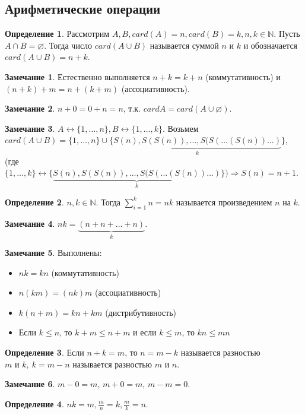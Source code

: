 \documentclass[a4paper, 12pt]{article}
\newcommand{\N}{\mathbb{N}}
\renewcommand{\emptyset}{\varnothing}
\theoremstyle{definition}
\newtheorem*{definition}{Определение}
\newtheorem*{comm}{Замечание}
\begin{document}
    \subsection{Арифметические операции}
        \begin{definition}
            Рассмотрим $A,B, card(A)=n, card(B)=k, n,k\in \N$. Пусть $A\cap B=\emptyset$. Тогда число $card(A\cup B)$ называется суммой $n$ и $k$ и обозначается $card(A\cup B)=n+k$.
        \end{definition}
        \begin{comm}
            Естественно выполняется $n+k=k+n$ (коммутативность) и\\ $(n+k)+m=n+(k+m)$ (ассоциативность).
        \end{comm}
        \begin{comm}
            $n+0=0+n=n$, т.к. $cardA=card(A\cup \emptyset)$.
        \end{comm}
        \begin{comm}
            $A \leftrightarrow \{1,\dots, n\}, B\leftrightarrow \{1,\dots, k\}$. Возьмем\\ $card(A\cup B)=\{1,\dots, n\}\cup \{\underbrace{S(n), S(S(n)), \dots, S(S(\dots (S(n))\dots)}_k\}$,\\ (где $\{1,\dots, k\} \leftrightarrow \{\underbrace{S(n), S(S(n)), \dots, S(S(\dots (S(n))\dots)}_k\}) \Rightarrow S(n)=n+1$.
        \end{comm} 
        \begin{definition}
            $n,k\in \N$. Тогда $\sum\limits_{i=1}^kn=nk$ называется произведением $n$ на $k$.
        \end{definition}
        \begin{comm}
            $nk=\underbrace{(n+n+\dots +n)}_k$. 
        \end{comm}
        \begin{comm} Выполнены:
            \begin{itemize}
                \item $nk=kn$ (коммутативность)
                \item $n(km)=(nk)m$ (ассоциативность)
                \item $k(n+m)=kn+km$ (дистрибутивность)
                \item Если $k\leq n$, то $k+m\leq n+m$ и если $k\leq m$, то $kn\leq mn$
            \end{itemize}
        \end{comm}
        \begin{definition}
            Если $n+k=m$, то $n=m-k$ называется разностью\\ $m$ и $k,\ k=m-n$ называется разностью $m$ и $n$.
        \end{definition}
        \begin{comm}
            $m-0=m$, $m+0=m$, $m-m=0$.
        \end{comm}
        \begin{definition}
            $nk=m, \frac{m}{n}=k, \frac{m}{k}=n$.
        \end{definition}
\end{document}
